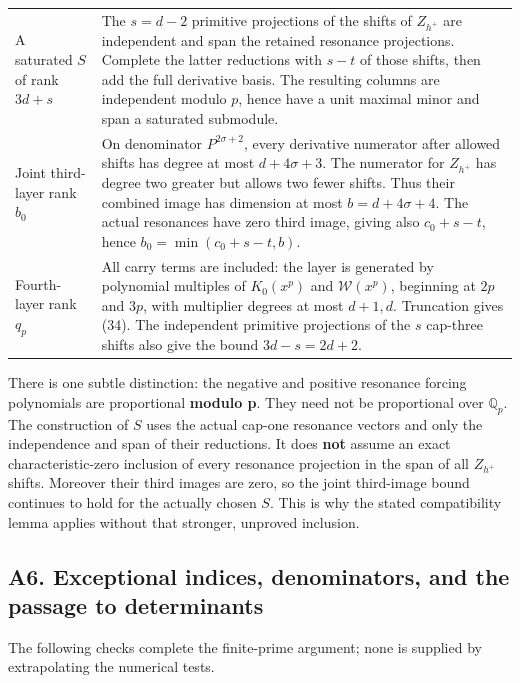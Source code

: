 \documentclass[11pt,a4paper]{article}
\begin{document}
\begin{longtable}[]{@{}
  >{\raggedright\arraybackslash}p{}
  >{\raggedright\arraybackslash}p{}@{}}
A saturated \(S\) of rank \(3d+s\) & The \(s=d-2\) primitive projections of the shifts of \(Z_{h^{+}}\) are independent and span the retained resonance projections. Complete the latter reductions with \(s-t\) of those shifts, then add the full derivative basis. The resulting columns are independent modulo \(p\), hence have a unit maximal minor and span a saturated submodule. \\
Joint third-layer rank \(b_{0}\) & On denominator \(P^{2σ+2}\), every derivative numerator after allowed shifts has degree at most \(d+4σ+3\). The numerator for \(Z_{h^{+}}\) has degree two greater but allows two fewer shifts. Thus their combined image has dimension at most \(b=d+4σ+4\). The actual resonances have zero third image, giving also \(c_{0}+s-t\), hence \(b_{0}=\operatorname{min}(c_{0}+s-t,b)\). \\
Fourth-layer rank \(q_p\) & All carry terms are included: the layer is generated by polynomial multiples of \(K_{0}(x^p)\) and \(\mathcal{W}(x^p)\), beginning at \(2p\) and \(3p\), with multiplier degrees at most \(d+1,d\). Truncation gives (34). The independent primitive projections of the \(s\) cap-three shifts also give the bound \(3d-s=2d+2\). \\
\end{longtable}

There is one subtle distinction: the negative and positive resonance forcing polynomials are proportional \textbf{modulo p}. They need not be proportional over \(\mathbb{Q}_p\). The construction of \(S\) uses the actual cap-one resonance vectors and only the independence and span of their reductions. It does \textbf{not} assume an exact characteristic-zero inclusion of every resonance projection in the span of all \(Z_{h^{+}}\) shifts. Moreover their third images are zero, so the joint third-image bound continues to hold for the actually chosen \(S\). This is why the stated compatibility lemma applies without that stronger, unproved inclusion.

\hypertarget{a6.-exceptional-indices-denominators-and-the-passage-to-determinants}{%
\subsection{A6. Exceptional indices, denominators, and the passage to determinants}\label{a6.-exceptional-indices-denominators-and-the-passage-to-determinants}}

The following checks complete the finite-prime argument; none is supplied by extrapolating the numerical tests.
\end{document}
